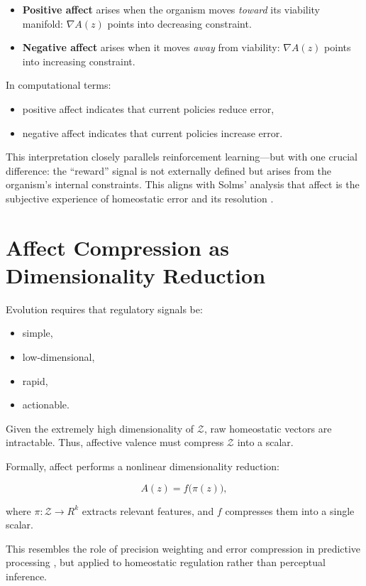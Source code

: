 \documentclass[12pt,oneside]{book}
\theoremstyle{plain}
\theoremstyle{definition}
\let\citep\parencite
\def\mathbb#1{#1}%
\begin{document}
\begin{itemize}
    \item \textbf{Positive affect} arises when the organism moves \emph{toward}
          its viability manifold: $\nabla A(z)$ points into decreasing constraint.
    \item \textbf{Negative affect} arises when it moves \emph{away} from viability:
          $\nabla A(z)$ points into increasing constraint.
\end{itemize}

In computational terms:
\begin{itemize}
    \item positive affect indicates that current policies reduce error,
    \item negative affect indicates that current policies increase error.
\end{itemize}

This interpretation closely parallels reinforcement learning---but with one
crucial difference:
the “reward” signal is not externally defined but arises from the organism’s
internal constraints.
This aligns with Solms’ analysis that affect is the subjective experience of
homeostatic error and its resolution
\citep{solms2021hidden}.

\section{Affect Compression as Dimensionality Reduction}

Evolution requires that regulatory signals be:
\begin{itemize}
    \item simple,
    \item low-dimensional,
    \item rapid,
    \item actionable.
\end{itemize}

Given the extremely high dimensionality of $\mathcal{Z}$, raw homeostatic
vectors are intractable.
Thus, affective valence must compress $\mathcal{Z}$ into a scalar.

Formally, affect performs a nonlinear dimensionality reduction:

\[
A(z) = f\big(\pi(z)\big),
\]

where $\pi : \mathcal{Z} \rightarrow \mathbb{R}^k$ extracts relevant features,
and $f$ compresses them into a single scalar.

This resembles the role of precision weighting and error compression in
predictive processing
\citep{friston2017active}, but applied to homeostatic regulation rather than
perceptual inference.
\end{document}
